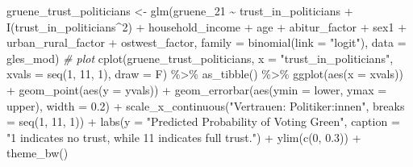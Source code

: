 \documentclass[
]{article}
\newenvironment{Shaded}{\begin{snugshade}}{\end{snugshade}}
\newcommand{\AttributeTok}[1]{\textcolor[rgb]{0.77,0.63,0.00}{#1}}
\newcommand{\CommentTok}[1]{\textcolor[rgb]{0.56,0.35,0.01}{\textit{#1}}}
\newcommand{\DecValTok}[1]{\textcolor[rgb]{0.00,0.00,0.81}{#1}}
\newcommand{\FloatTok}[1]{\textcolor[rgb]{0.00,0.00,0.81}{#1}}
\newcommand{\FunctionTok}[1]{\textcolor[rgb]{0.00,0.00,0.00}{#1}}
\newcommand{\NormalTok}[1]{#1}
\newcommand{\OtherTok}[1]{\textcolor[rgb]{0.56,0.35,0.01}{#1}}
\newcommand{\SpecialCharTok}[1]{\textcolor[rgb]{0.00,0.00,0.00}{#1}}
\newcommand{\StringTok}[1]{\textcolor[rgb]{0.31,0.60,0.02}{#1}}
\begin{document}
\begin{Shaded}
\begin{Highlighting}[]
\NormalTok{gruene\_trust\_politicians }\OtherTok{\textless{}{-}} \FunctionTok{glm}\NormalTok{(gruene\_21 }\SpecialCharTok{\textasciitilde{}}\NormalTok{ trust\_in\_politicians }\SpecialCharTok{+} \FunctionTok{I}\NormalTok{(trust\_in\_politicians}\SpecialCharTok{\^{}}\DecValTok{2}\NormalTok{) }\SpecialCharTok{+}\NormalTok{ household\_income }\SpecialCharTok{+}\NormalTok{ age }\SpecialCharTok{+}\NormalTok{ abitur\_factor }\SpecialCharTok{+}\NormalTok{ sex1 }\SpecialCharTok{+}\NormalTok{ urban\_rural\_factor }\SpecialCharTok{+}\NormalTok{ ostwest\_factor, }\AttributeTok{family =} \FunctionTok{binomial}\NormalTok{(}\AttributeTok{link =} \StringTok{"logit"}\NormalTok{), }\AttributeTok{data =}\NormalTok{ gles\_mod)}
\CommentTok{\# plot }
\FunctionTok{cplot}\NormalTok{(gruene\_trust\_politicians, }\AttributeTok{x =} \StringTok{"trust\_in\_politicians"}\NormalTok{,}
      \AttributeTok{xvals =} \FunctionTok{seq}\NormalTok{(}\DecValTok{1}\NormalTok{, }\DecValTok{11}\NormalTok{, }\DecValTok{1}\NormalTok{), }\AttributeTok{draw =}\NormalTok{ F) }\SpecialCharTok{\%\textgreater{}\%}
  \FunctionTok{as\_tibble}\NormalTok{() }\SpecialCharTok{\%\textgreater{}\%}
  \FunctionTok{ggplot}\NormalTok{(}\FunctionTok{aes}\NormalTok{(}\AttributeTok{x =}\NormalTok{ xvals)) }\SpecialCharTok{+}
  \FunctionTok{geom\_point}\NormalTok{(}\FunctionTok{aes}\NormalTok{(}\AttributeTok{y =}\NormalTok{ yvals)) }\SpecialCharTok{+}
  \FunctionTok{geom\_errorbar}\NormalTok{(}\FunctionTok{aes}\NormalTok{(}\AttributeTok{ymin =}\NormalTok{ lower, }\AttributeTok{ymax =}\NormalTok{ upper), }\AttributeTok{width =} \FloatTok{0.2}\NormalTok{) }\SpecialCharTok{+}
  \FunctionTok{scale\_x\_continuous}\NormalTok{(}\StringTok{"Vertrauen: Politiker:innen"}\NormalTok{, }
                     \AttributeTok{breaks =} \FunctionTok{seq}\NormalTok{(}\DecValTok{1}\NormalTok{, }\DecValTok{11}\NormalTok{, }\DecValTok{1}\NormalTok{)) }\SpecialCharTok{+}
  \FunctionTok{labs}\NormalTok{(}\AttributeTok{y =} \StringTok{"Predicted Probability of Voting Green"}\NormalTok{, }
       \AttributeTok{caption =} \StringTok{"\textquotesingle{}1\textquotesingle{} indicates \textquotesingle{}no trust\textquotesingle{}, while 11 indicates \textquotesingle{}full trust\textquotesingle{}."}\NormalTok{) }\SpecialCharTok{+}
  \FunctionTok{ylim}\NormalTok{(}\FunctionTok{c}\NormalTok{(}\DecValTok{0}\NormalTok{, }\FloatTok{0.3}\NormalTok{)) }\SpecialCharTok{+}
  \FunctionTok{theme\_bw}\NormalTok{()}
\end{Highlighting}
\end{Shaded}
\end{document}
